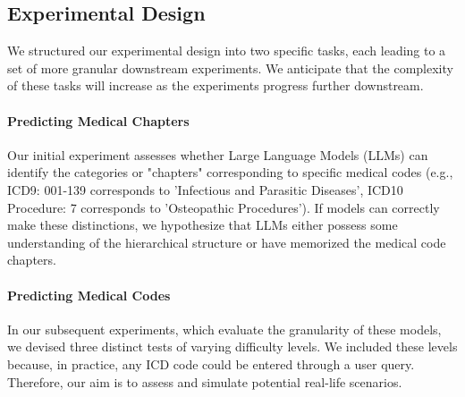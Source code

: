 \documentclass[11pt]{article}
\theoremstyle{plain}
\theoremstyle{definition}
\theoremstyle{remark}
\begin{document}
\subsection{Experimental Design}
\label{exper}

We structured our experimental design into two specific tasks, each leading to a set of more granular downstream experiments. We anticipate that the complexity of these tasks will increase as the experiments progress further downstream.

\paragraph{Predicting Medical Chapters} Our initial experiment assesses whether Large Language Models (LLMs) can identify the categories or "chapters" corresponding to specific medical codes (e.g., ICD9: 001-139 corresponds to 'Infectious and Parasitic Diseases', ICD10 Procedure: 7 corresponds to 'Osteopathic Procedures'). If models can correctly make these distinctions, we hypothesize that LLMs either possess some understanding of the hierarchical structure or have memorized the medical code chapters.

\paragraph{Predicting Medical Codes} In our subsequent experiments, which evaluate the granularity of these models, we devised three distinct tests of varying difficulty levels. We included these levels because, in practice, any ICD code could be entered through a user query. Therefore, our aim is to assess and simulate potential real-life scenarios.
\end{document}
